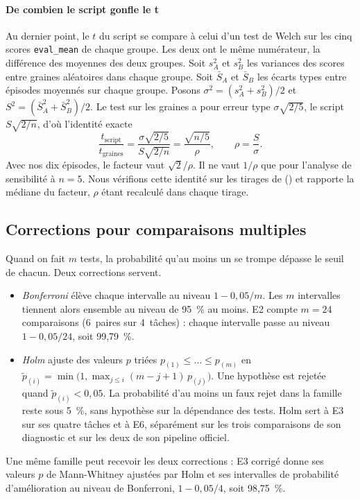 \paragraph{De combien le script gonfle le t}
Au dernier point, le $t$ du script se compare à celui d'un test de Welch sur les cinq scores
\texttt{eval\_mean} de chaque groupe. Les deux ont le même numérateur, la différence des moyennes des deux groupes.
Soit $s_A^2$ et $s_B^2$ les variances des scores entre graines aléatoires dans chaque groupe. Soit $\bar S_A$
et $\bar S_B$ les écarts types entre épisodes moyennés sur chaque groupe. Posons $\sigma^2=(s_A^2+s_B^2)/2$ et
$S^2=(\bar S_A^2+\bar S_B^2)/2$. Le test sur les graines a pour erreur type $\sigma\sqrt{2/5}$, le script
$S\sqrt{2/n}$, d'où l'identité exacte
\begin{equation}\label{eq:facteur-b1}
  \frac{t_{\text{script}}}{t_{\text{graines}}}=\frac{\sigma\sqrt{2/5}}{S\sqrt{2/n}}
  =\frac{\sqrt{n/5}}{\rho},\qquad \rho=\frac{S}{\sigma}.
\end{equation}
Avec nos dix épisodes, le facteur vaut $\sqrt2/\rho$. Il ne vaut $1/\rho$ que pour l'analyse de sensibilité à
$n=5$. Nous vérifions cette identité sur les tirages de 
() et rapporte la médiane du facteur, $\rho$ étant recalculé dans chaque tirage.

\subsection{Corrections pour comparaisons multiples}\label{sec:multiples}
Quand on fait $m$ tests, la probabilité qu'au moins un se trompe dépasse le seuil de chacun. Deux corrections
servent.
\begin{itemize}
  \item \emph{Bonferroni} \parencite{dunn1961multiple} élève chaque intervalle au niveau $1-0{,}05/m$. Les
    $m$ intervalles tiennent alors ensemble au niveau de 95~\% au moins. E2 compte $m=24$ comparaisons
    (6~paires sur 4~tâches) : chaque intervalle passe au niveau $1-0{,}05/24$, soit 99,79~\%.
  \item \emph{Holm} \parencite{holm1979simple} ajuste des valeurs $p$ triées
    $p_{(1)}\le\dots\le p_{(m)}$ en
    $\tilde p_{(i)}=\min\bigl(1,\max_{j\le i}(m-j+1)\,p_{(j)}\bigr)$. Une hypothèse est rejetée quand
    $\tilde p_{(i)}<0{,}05$. La probabilité d'au moins un faux rejet dans la famille reste sous 5~\%, sans
    hypothèse sur la dépendance des tests. Holm sert à E3 sur ses quatre tâches et à E6,
    séparément sur les trois comparaisons de son diagnostic et sur les deux de son pipeline officiel.
\end{itemize}
Une même famille peut recevoir les deux corrections : E3 corrigé donne ses valeurs $p$ de Mann-Whitney ajustées
par Holm et ses intervalles de probabilité d'amélioration au niveau de Bonferroni, $1-0{,}05/4$, soit
98,75~\%.


